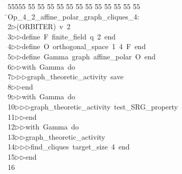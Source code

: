 %
%
\begin{tabbing}
55555 \= 55 \= 55 \= 55 \= 55 \= 55 \= 55 \= 55 \= 55 \= 55 \= 55 \= 55 \= 55 \= \>Op\_4\_2\_affine\_polar\_graph\_cliques\_4:\\[0pt]
2\>$\triangleright$\>(ORBITER)\ v\ 2\ \\[0pt]
3\>$\triangleright$\>$\triangleright$\>define\ F\ finite\_field\ q\ 2\ end\ \\[0pt]
4\>$\triangleright$\>$\triangleright$\>define\ O\ orthogonal\_space\ 1\ 4\ F\ end\ \\[0pt]
5\>$\triangleright$\>$\triangleright$\>define\ Gamma\ graph\ affine\_polar\ O\ end\ \\[0pt]
6\>$\triangleright$\>$\triangleright$\>with\ Gamma\ do\ \\[0pt]
7\>$\triangleright$\>$\triangleright$\>$\triangleright$\>graph\_theoretic\_activity\ save\ \\[0pt]
8\>$\triangleright$\>$\triangleright$\>end\ \\[0pt]
9\>$\triangleright$\>$\triangleright$\>with\ Gamma\ do\ \\[0pt]
10\>$\triangleright$\>$\triangleright$\>$\triangleright$\>graph\_theoretic\_activity\ test\_SRG\_property\ \\[0pt]
11\>$\triangleright$\>$\triangleright$\>end\ \\[0pt]
12\>$\triangleright$\>$\triangleright$\>with\ Gamma\ do\ \\[0pt]
13\>$\triangleright$\>$\triangleright$\>graph\_theoretic\_activity\ \\[0pt]
14\>$\triangleright$\>$\triangleright$\>$\triangleright$\>find\_cliques\ target\_size\ 4\ end\ \\[0pt]
15\>$\triangleright$\>$\triangleright$\>end\ \\[0pt]
16\>\end{tabbing}
